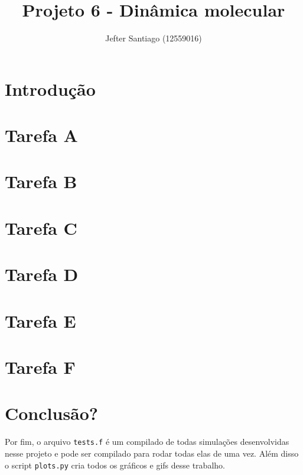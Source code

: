 \documentclass[a4paper, 13pt]{article}
\title{\color{blue}Projeto 6 - Dinâmica molecular}
\author{Jefter Santiago (12559016)}
\begin{document}
\maketitle
\section{Introdução}

\section{Tarefa A}

\section{Tarefa B}

\section{Tarefa C}

\section{Tarefa D}

\section{Tarefa E}

\section{Tarefa F}


\section{Conclusão?} 


Por fim, o arquivo \verb|tests.f| é um compilado de todas simulações desenvolvidas nesse projeto 
e pode ser compilado para rodar todas elas de uma vez. Além disso o script \verb|plots.py| cria todos 
os gráficos e gifs desse trabalho.


\nocite{*}
\printbibliography[title = Referências]
\end{document}

